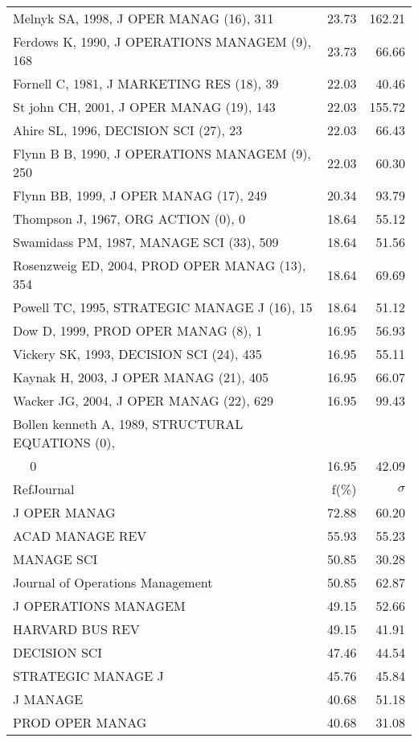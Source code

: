 \documentclass[a4paper,11pt]{report}
\begin{document}
\begin{landscape}
\begin{table}[!ht]
{\begin{tabular}{|l r r|}
Melnyk SA, 1998, J OPER MANAG (16), 311 & 23.73 & 162.21\\
Ferdows K, 1990, J OPERATIONS MANAGEM (9), 168 & 23.73 & 66.66\\
Fornell C, 1981, J MARKETING RES (18), 39 & 22.03 & 40.46\\
St john CH, 2001, J OPER MANAG (19), 143 & 22.03 & 155.72\\
Ahire SL, 1996, DECISION SCI (27), 23 & 22.03 & 66.43\\
Flynn B B, 1990, J OPERATIONS MANAGEM (9), 250 & 22.03 & 60.30\\
Flynn BB, 1999, J OPER MANAG (17), 249 & 20.34 & 93.79\\
Thompson J, 1967, ORG ACTION (0), 0 & 18.64 & 55.12\\
Swamidass PM, 1987, MANAGE SCI (33), 509 & 18.64 & 51.56\\
Rosenzweig ED, 2004, PROD OPER MANAG (13), 354 & 18.64 & 69.69\\
Powell TC, 1995, STRATEGIC MANAGE J (16), 15 & 18.64 & 51.12\\
Dow D, 1999, PROD OPER MANAG (8), 1 & 16.95 & 56.93\\
Vickery SK, 1993, DECISION SCI (24), 435 & 16.95 & 55.11\\
Kaynak H, 2003, J OPER MANAG (21), 405 & 16.95 & 66.07\\
Wacker JG, 2004, J OPER MANAG (22), 629 & 16.95 & 99.43\\
Bollen kenneth A, 1989, STRUCTURAL EQUATIONS (0), &  & \\
$\quad$ 0 & 16.95 & 42.09\\
\hline
\hline
RefJournal & f(\%) & $\sigma$\\
\hline
J OPER MANAG & 72.88 & 60.20\\
ACAD MANAGE REV & 55.93 & 55.23\\
MANAGE SCI & 50.85 & 30.28\\
Journal of Operations Management & 50.85 & 62.87\\
J OPERATIONS MANAGEM & 49.15 & 52.66\\
HARVARD BUS REV & 49.15 & 41.91\\
DECISION SCI & 47.46 & 44.54\\
STRATEGIC MANAGE J & 45.76 & 45.84\\
J MANAGE & 40.68 & 51.18\\
PROD OPER MANAG & 40.68 & 31.08\\
\hline
\end{tabular}
}
\end{table}

\end{landscape}
\end{document}
